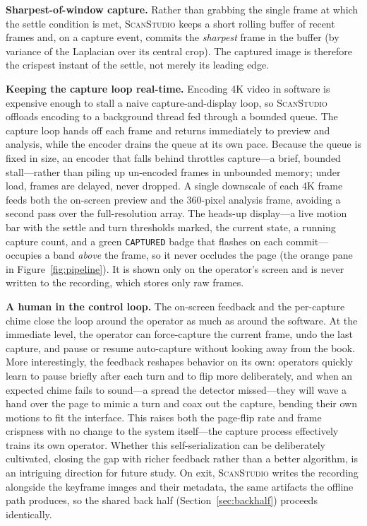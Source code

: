\documentclass{article}
\newcommand{\sys}{\textsc{ScanStudio}\xspace}
\begin{document}
\noindent\textbf{Sharpest-of-window capture.}
Rather than grabbing the single frame at which the settle condition is met, \sys
keeps a short rolling buffer of recent frames and, on a capture event, commits the
\emph{sharpest} frame in the buffer (by variance of the Laplacian over its central
crop). The captured image is therefore the crispest instant of the settle, not
merely its leading edge.

\noindent\textbf{Keeping the capture loop real-time.}
Encoding 4K video in software is expensive enough to stall a naive
capture-and-display loop, so \sys offloads encoding to a background thread fed
through a bounded queue. The capture loop hands off each frame and returns
immediately to preview and analysis, while the encoder drains the queue at its
own pace. Because the queue is fixed in size, an encoder that falls behind
throttles capture---a brief, bounded stall---rather than piling up un-encoded
frames in unbounded memory; under load, frames are delayed, never dropped. A single downscale of each
4K frame feeds both the on-screen preview and the 360-pixel analysis frame,
avoiding a second pass over the full-resolution array. The heads-up display---a live motion bar with the settle and turn thresholds
marked, the current state, a running capture count, and a green
\texttt{CAPTURED} badge that flashes on each commit---occupies a band
\emph{above} the frame, so it never occludes the page (the orange pane in
Figure~\ref{fig:pipeline}). It is shown only on the operator's screen and is
never written to the recording, which stores only raw frames.

\noindent\textbf{A human in the control loop.}
The on-screen feedback and the per-capture chime close the loop around the operator
as much as around the software. At the immediate level, the operator can
force-capture the current frame, undo the last capture, and pause or resume
auto-capture without looking away from the book. More interestingly, the feedback
reshapes behavior on its own: operators quickly learn to pause briefly after each
turn and to flip more deliberately, and when an expected chime fails to sound---a
spread the detector missed---they will wave a hand over the page to mimic a turn and
coax out the capture, bending their own motions to fit the interface. This raises
both the page-flip rate and frame crispness with no change to the system
itself---the capture process effectively trains its own operator. Whether this self-serialization can be deliberately
cultivated, closing the gap with richer feedback rather than a better algorithm,
is an intriguing direction for future study. On exit, \sys writes the recording
alongside the keyframe images and their metadata, the same artifacts the offline
path produces, so the shared back half (Section~\ref{sec:backhalf}) proceeds
identically.
\end{document}
